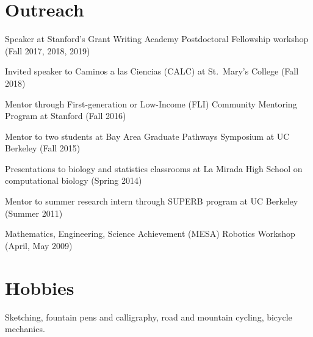 \documentclass[11pt,notitlepage]{article} %
\begin{document}
\section*{Outreach}
\medskip
Speaker at Stanford's Grant Writing Academy Postdoctoral Fellowship workshop (Fall 2017, 2018, 2019)

\medskip
Invited speaker to Caminos a las Ciencias (CALC) at St.\ Mary's College (Fall 2018)

\medskip

Mentor through First-generation or Low-Income (FLI) Community Mentoring Program at Stanford (Fall 2016)

\medskip

Mentor to two students at Bay Area Graduate Pathways Symposium at UC Berkeley (Fall 2015)

\medskip
Presentations to biology and statistics classrooms at La Mirada High School on
computational biology (Spring 2014)

\medskip

Mentor to summer research intern through SUPERB program at UC Berkeley (Summer
2011)

\medskip

Mathematics, Engineering, Science Achievement (MESA) Robotics Workshop (April, May 2009)

\bigskip
\section*{Hobbies}
\medskip
Sketching, fountain pens and calligraphy, road and mountain cycling, bicycle mechanics.
\end{document}
